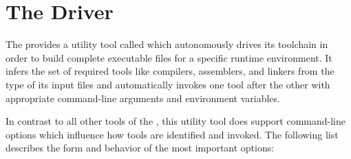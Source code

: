 \section{The \ecs{} Driver}

The \ecs{} provides a utility tool called  which autonomously drives its toolchain in order to build complete executable files for a specific runtime environment.
It infers the set of required tools like compilers, assemblers, and linkers from the type of its input files and automatically invokes one tool after the other with appropriate command-line arguments and environment variables.


In contrast to all other tools of the \ecs{}, this utility tool does support command-line options which influence how tools are identified and invoked.
The following list describes the form and behavior of the most important options:

